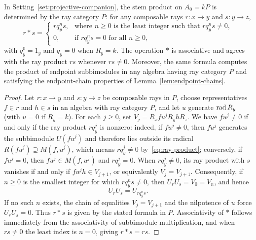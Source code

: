 \begin{proposition}
\label{prop:intrinsic-stem-product}
In Setting~\ref{set:projective-companion}, the stem product on $A_0=kP$ is determined by the ray category $P$: for any composable rays $r\colon x\to y$ and $s\colon y\to z$,
\[
  r*s=\begin{cases}
  rq_y^ns, & \text{where }n\geq0\text{ is the least integer such that }rq_y^ns\ne0,\\
  0, & \text{if }rq_y^ns=0\text{ for all }n\geq0,
  \end{cases}
\]
with $q_y^0=1_y$ and $q_y=0$ when $R_y=k$. The operation $*$ is associative and agrees with the ray product $rs$ whenever $rs\ne0$. Moreover, the same formula computes the product of endpoint subbimodules in any algebra having ray category $P$ and satisfying the endpoint-chain properties of Lemma~\ref{lem:endpoint-chains}.
\end{proposition}
\begin{proof}
Let $r\colon x\to y$ and $s\colon y\to z$ be composable rays in $P$, choose representatives $f\in r$ and $h\in s$ in an algebra with ray category $P$, and let $u$ generate $\operatorname{rad} R_y$ (with $u=0$ if $R_y=k$). For each $j\geq0$, set $V_j=R_xfu^jR_yhR_z$. We have $fu^j\ne0$ if and only if the ray product $rq_y^j$ is nonzero: indeed, if $fu^j\ne0$, then $fu^j$ generates the subbimodule $U(fu^j)$ and therefore lies outside its radical $R(fu^j)\supseteq M(f,u^j)$, which means $rq_y^j\ne0$ by~\eqref{eq:ray-product}; conversely, if $fu^j=0$, then $fu^j\in M(f,u^j)$ and $rq_y^j=0$. When $rq_y^j\ne0$, its ray product with $s$ vanishes if and only if $fu^jh\in V_{j+1}$, or equivalently $V_j=V_{j+1}$. Consequently, if $n\geq0$ is the smallest integer for which $rq_y^ns\ne0$, then $U_rU_s=V_0=V_n$, and hence
\begin{equation}
  U_rU_s=U_{rq_y^ns}.
  \label{eq:intrinsic-stem-product}
\end{equation}
If no such $n$ exists, the chain of equalities $V_j=V_{j+1}$ and the nilpotence of $u$ force $U_rU_s=0$. Thus $r*s$ is given by the stated formula in $P$. Associativity of $*$ follows immediately from the associativity of subbimodule multiplication, and when $rs\ne0$ the least index is $n=0$, giving $r*s=rs$.
\end{proof}

